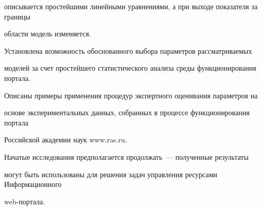 описывается простейшими линейными уравнениями, а при выходе показателя за границы 


области модель изменяется.


      


      Установлена возможность обоснованного выбора параметров рассматриваемых 


моделей за счет простейшего статистического анализа среды функционирования портала.


      


      Описаны примеры применения процедур экспертного оценивания параметров на 


основе экспериментальных данных, собранных в процессе функционирования портала 


Российской академии наук {\sf www.ras.ru}.


      


      Начатые исследования предполагается продолжать~--- полученные результаты 


могут быть использованы для решения задач управления ресурсами Информационного 


web-портала.


      


